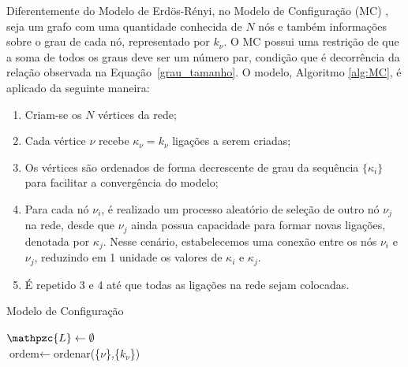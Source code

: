 Diferentemente do Modelo de Erdös-Rényi, no Modelo de Configuração (MC) \cite{networks}, seja um grafo com uma quantidade conhecida de $N$ nós e também informações sobre o grau de cada nó, representado por
$k_\nu$. O MC 
possui uma restrição de que a soma de todos os graus deve ser um número par, condição 
que é decorrência da relação observada na
Equação~\ref{grau_tamanho}. O modelo, Algoritmo \ref{alg:MC}, é aplicado da seguinte maneira:
\begin{enumerate}
  \item Criam-se os $N$ vértices da rede;
  \item Cada vértice $\nu$ recebe
  $\kappa_\nu = k_\nu$ ligações a serem criadas;
  \item Os vértices são ordenados de forma decrescente de grau da sequência $\{\kappa_i\}$ para facilitar a convergência do modelo;
  \item Para cada nó $\nu_i$, é realizado um processo aleatório de seleção de outro nó $\nu_j$ na rede, desde que $\nu_j$ ainda possua capacidade para formar novas ligações, denotada por 
  $\kappa_j$. Nesse cenário, estabelecemos uma conexão entre os nós $\nu_i$ e $\nu_j$, reduzindo em 1 unidade os valores de
  $\kappa_i$ e $\kappa_j$.
  \item É repetido 3 e 4 até que todas as ligações na rede sejam colocadas. 
\end{enumerate}
\begin{algorithm}[htbp]
   \caption{Modelo de Configuração}
   \label{alg:MC}
   
   $\mathpzc{L} \gets \emptyset$\\
   $\text{ordem} \gets $ordenar(\{$\nu$\},\{$k_\nu$\}) 
   
\end{algorithm}

